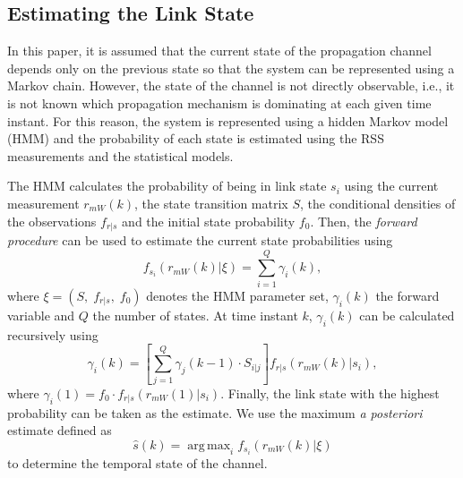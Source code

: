\documentclass[journal, 10pt, twocolumn, balance]{IEEEtran}
\DeclareMathOperator*{\argmax}{arg\,max}
\begin{document}
\subsection{Estimating the Link State}

In this paper, it is assumed that the current state of the propagation channel depends only on the previous state so that the system can be represented using a Markov chain. However, the state of the channel is not directly observable, i.e., it is not known which propagation mechanism is dominating at each given time instant. For this reason, the system is represented using a hidden Markov model (HMM) and the probability of each state is estimated using the RSS measurements and the statistical models.

The HMM calculates the probability of being in link state $s_i$ using the current measurement $r_{mW}(k)$, the state transition matrix $S$, the conditional densities of the observations $f_{r \vert s}$ and the initial state probability $f_0$. Then, the \emph{forward procedure} \cite[pp. 109-114]{Therrien1992} can be used to estimate the current state probabilities using
\begin{equation} \label{eq:forward_procedure}
     f_{s_i}(r_{mW}(k) \vert \xi) = \sum_{i=1}^{Q}\gamma_i(k),
\end{equation}
where $\xi = (S, \; f_{r \vert s}, \;f_0)$ denotes the HMM parameter set, $\gamma_i(k)$ the forward variable and $Q$ the number of states. At time instant $k$, $\gamma_i(k)$ can be calculated recursively using
\begin{equation} \label{eq:forward_variable}
     \gamma_i(k) = \left[\sum_{j=1}^{Q}\gamma_j(k-1) \cdot S_{i \lvert j}\right]f_{r \vert s}(r_{mW}(k)\lvert s_i),
\end{equation}
where $\gamma_i(1) = f_0 \cdot f_{r \vert s}(r_{mW}(1)\lvert s_i)$. Finally, the link state with the highest probability can be taken as the estimate. We use the maximum \emph{a posteriori} estimate defined as 
\begin{equation} \label{eq:state_estimate}
\hat{s}(k) = \argmax_i f_{s_i}(r_{mW}(k) \vert \xi)
\end{equation}
to determine the temporal state of the channel.
\end{document}
